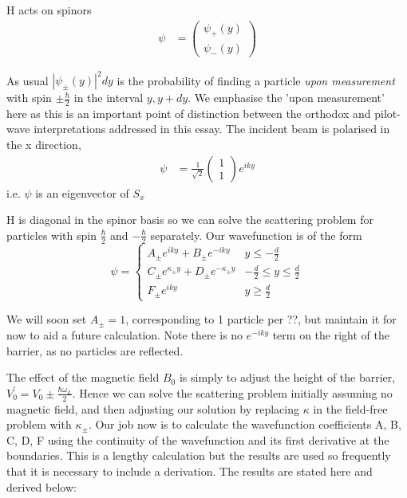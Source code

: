 \documentclass{article}
\begin{document}
H acts on spinors
\begin{align}
	\psi &= \begin{pmatrix}
		\psi_{+}(y) \\
		\psi_{-}(y)
		\end{pmatrix}
\end{align}

As usual $|\psi_{\pm}(y)|^{2}dy$ is the probability of finding a particle \textit{upon measurement} with spin $\pm \frac{\hbar}{2}$ in the interval $y, y+dy$. We emphasise the 'upon measurement' here as this is an important point of distinction between the orthodox and pilot-wave interpretations addressed in this essay. The incident beam is polarised in the x direction,
\begin{align}
	\psi &= \frac{1}{\sqrt{2}}
	\begin{pmatrix}
	1\\
	1
	\end{pmatrix}
	e^{i k y}
\end{align}
i.e. $\psi$ is an eigenvector of $S_{x}$

H is diagonal in the spinor basis so we can solve the scattering problem for particles with spin $\frac{\hbar}{2}$ and $-\frac{\hbar}{2}$ separately. 
Our wavefunction is of the form
\begin{equation}
	\psi = 
	\begin{cases}
		A_{\pm}e^{i k y} + B_{\pm}e^{-i k y} & y \leq -\frac{d}{2} \\
		C_{\pm}e^{\kappa_{\pm}y} + D_{\pm}e^{-\kappa_{\pm}y} & -\frac{d}{2} \leq y \leq \frac{d}{2} \\
		F_{\pm}e^{i k y} & y \geq \frac{d}{2}
	\end{cases}
\end{equation}

We will soon set $A_{\pm} = 1$, corresponding to 1 particle per ??, but maintain it for now to aid a future calculation. Note there is no $e^{-i k y}$ term on the right of the barrier, as no particles are reflected. 

The effect of the magnetic field $B_0$ is simply to adjust the height of the barrier, $V_0^{'} = V_0 \pm \frac{\hbar \omega_L}{2}$. Hence we can solve the scattering problem initially assuming no magnetic field, and then adjusting our solution by replacing $\kappa$ in the field-free problem with $\kappa_{\pm}$. Our job now is to calculate the wavefunction coefficients A, B, C, D, F using the continuity of the wavefunction and its first derivative at the boundaries.
This is a lengthy calculation but the results are used so frequently that it is necessary to include a derivation. The results are stated here and derived below:
\end{document}
